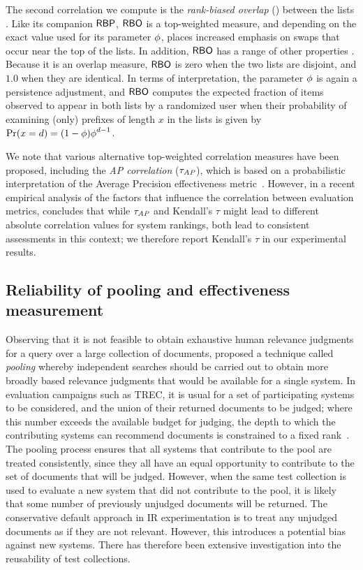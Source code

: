 The second correlation we compute is the {\emph{rank-biased overlap}}
(\rbo) between the lists {\citep{wmz10acmtois}}.
Like its companion ${\mbox{\sf{RBP}}}$, ${\mbox{\sf{RBO}}}$ is a top-weighted measure, and
depending on the exact value used for its parameter $\mbox{$\phi$}$, places
increased emphasis on swaps that occur near the top of the lists.
In addition, ${\mbox{\sf{RBO}}}$ has a range of other properties
{\citep{wmz10acmtois}}.
Because it is an overlap measure, ${\mbox{\sf{RBO}}}$ is zero when the two lists
are disjoint, and $1.0$ when they are identical.
In terms of interpretation, the parameter $\mbox{$\phi$}$ is again a
persistence adjustment, and ${\mbox{\sf{RBO}}}$ computes the expected fraction of
items observed to appear in both lists by a randomized user when
their probability of examining (only) prefixes of length $x$ in the
lists is given by $\mbox{Pr}(x=d) = (1-\mbox{$\phi$})\mbox{$\phi$}^{d-1}$.

We note that various alternative top-weighted correlation measures
have been proposed, including the {\emph{AP correlation}} ($\tau_{\mbox{\scriptsize\it{AP}}}$),
which is based on a probabilistic interpretation of the Average
Precision effectiveness metric~{\citep{yas08sigir}}.
However, in a recent empirical analysis of the factors that influence
the correlation between evaluation metrics, {\citet{ferro17acmtois}}
concludes that while $\tau_{\mbox{\scriptsize\it{AP}}}$ and Kendall's $\tau$ might lead to
different absolute correlation values for system rankings, both lead
to consistent assessments in this context; we therefore report
Kendall's $\tau$ in our experimental results.

\subsection{Reliability of pooling and effectiveness measurement}

Observing that it is not feasible to obtain exhaustive human
relevance judgments for a query over a large collection of
documents, {\citet{spark1975report}} proposed a technique called
{\emph{pooling}} whereby independent searches should be carried out
to obtain more broadly based relevance judgments that would be
available for a single system.
In evaluation campaigns such as TREC, it is usual for a set of
participating systems to be considered, and the union of their
returned documents to be judged; where this number exceeds the
available budget for judging, the depth to which the contributing
systems can recommend documents is constrained to a fixed
rank~\citep{vh05trecbook}.
The pooling process ensures that all systems that contribute to the
pool are treated consistently, since they all have an equal
opportunity to contribute to the set of documents that will be
judged.
However, when the same test collection is used to evaluate a new
system that did not contribute to the pool, it is likely that some
number of previously unjudged documents will be returned.
The conservative default approach in IR experimentation is to treat
any unjudged documents as if they are not relevant.
However, this introduces a potential bias against new systems.
There has therefore been extensive investigation into the reusability
of test collections.

